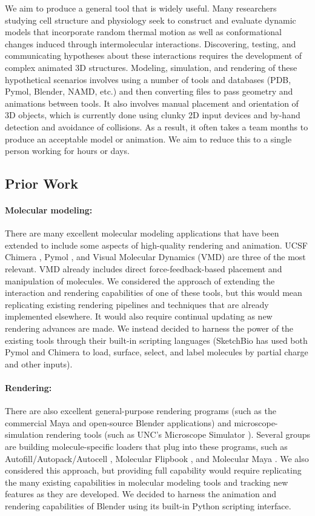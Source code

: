 \documentclass[twocolumn]{bmcart}%
\begin{document}
We aim to produce a general tool that is widely useful.  Many researchers studying cell structure and physiology seek to construct
and evaluate dynamic models that incorporate random thermal motion as
well as conformational changes induced through intermolecular interactions.
Discovering, testing, and communicating hypotheses about these
interactions requires the development of complex animated 3D structures. Modeling, simulation, and rendering
of these hypothetical scenarios involves using a number of tools and databases (PDB, Pymol, Blender, NAMD, etc.)
and then converting files to pass geometry and animations between tools. It also involves
manual placement and orientation of 3D objects, which is currently done using clunky 2D input devices and by-hand
detection and avoidance of collisions. As a result, it often takes a team months to produce an acceptable
model or animation. We aim to reduce this to a single person working for hours or days.

\subsection*{Prior Work}
\paragraph*{Molecular modeling:}
There are many excellent molecular modeling applications that have been extended to include some aspects of high-quality rendering and animation.  UCSF Chimera \cite{pettersen2004ucsf}, Pymol \cite{pymol2013}, and Visual Molecular Dynamics (VMD) \cite{humphrey1996} are three of the most relevant.  VMD already includes direct force-feedback-based placement and manipulation of molecules.  We considered the approach of extending the interaction and rendering capabilities of one of these tools, but this would mean replicating existing rendering pipelines and techniques that are already implemented elsewhere.  It would also require continual updating as new rendering advances are made.  We instead decided to harness the power of the existing tools through their built-in scripting languages (SketchBio has used both Pymol and Chimera to load, surface, select, and label molecules by partial charge and other inputs).

\paragraph*{Rendering:}
There are also excellent general-purpose rendering programs (such as the commercial Maya and open-source Blender applications) and microscope-simulation rendering tools (such as UNC's Microscope Simulator \cite{quammen2008}).  Several groups are building molecule-specific loaders that plug into these programs, such as Autofill/Autopack/Autocell \cite{Johnson 2013}, Molecular Flipbook \cite{flipbook2013}, and Molecular Maya \cite{molecularmaya}.  We also considered this approach, but providing full capability would require replicating the many existing capabilities in molecular modeling tools and tracking new features as they are developed.  We decided to harness the animation and rendering capabilities of Blender using its built-in Python scripting interface.
\end{document}
